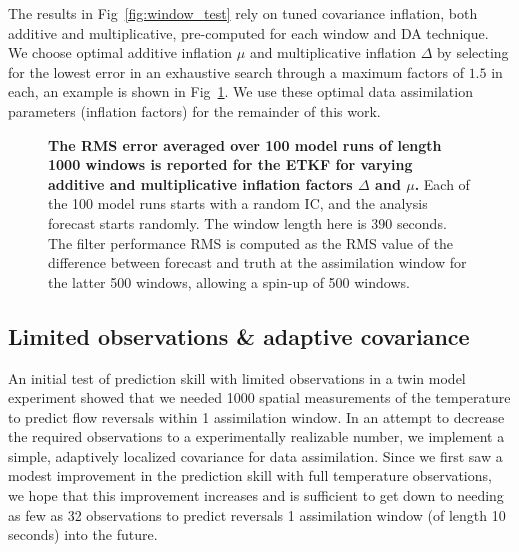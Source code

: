 \documentclass[10pt,letterpaper]{article}
\begin{document}
The results in Fig~\ref{fig:window_test} rely on tuned covariance inflation, both additive and multiplicative, pre-computed for each window and DA technique.
We choose optimal additive inflation $\mu$ and multiplicative inflation $\Delta$ by selecting for the lowest error in an exhaustive search through a maximum factors of $1.5$ in each, an example is shown in Fig~\ref{fig:ETKF_cov_tuning_390s}.
We use these optimal data assimilation parameters (inflation factors) for the remainder of this work.

\begin{figure}[h]
  \centering
  \caption[The RMS error averaged over 100 model runs of length 1000 windows is reported for the ETKF for varying additive and multiplicative inflation factors]{
\textbf{    The RMS error averaged over 100 model runs of length 1000 windows is reported for the ETKF for varying additive and multiplicative inflation factors $\Delta$ and $\mu$.
}    Each of the 100 model runs starts with a random IC, and the analysis forecast starts randomly.
    The window length here is 390 seconds.
    The filter performance RMS is computed as the RMS value of the difference between forecast and truth at the assimilation window for the latter 500 windows, allowing a spin-up of 500 windows.
  }
  \label{fig:ETKF_cov_tuning_390s}
\end{figure}

\subsection*{Limited observations \& adaptive covariance}

An initial test of prediction skill with limited observations in a twin model experiment showed that we needed 1000 spatial measurements of the temperature to predict flow reversals within 1 assimilation window.
In an attempt to decrease the required observations to a experimentally realizable number, we implement a simple, adaptively localized covariance for data assimilation.
Since we first saw a modest improvement in the prediction skill with full temperature observations, we hope that this improvement increases and is sufficient to get down to needing as few as 32 observations to predict reversals 1 assimilation window (of length 10 seconds) into the future.
\end{document}

